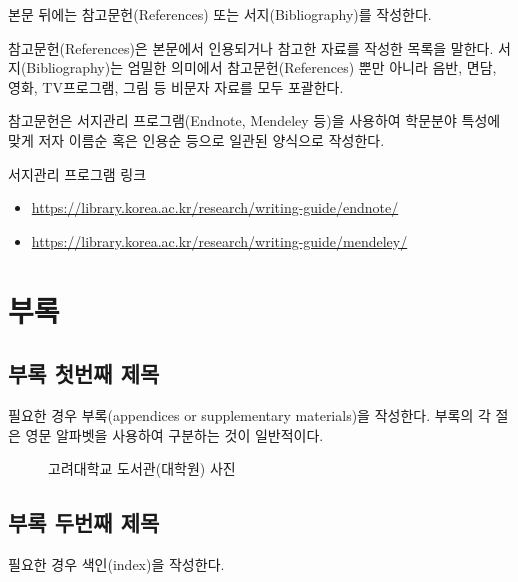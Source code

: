 \documentclass[11pt]{report}
\begin{document}
\bigskip

본문 뒤에는 참고문헌(References) 또는 서지(Bibliography)를 작성한다.\par
참고문헌(References)은 본문에서 인용되거나 참고한 자료를 작성한 목록을 말한다. 서지(Bibliography)는 엄밀한 의미에서 참고문헌(References) 뿐만 아니라 음반, 면담, 영화, TV프로그램, 그림 등 비문자 자료를 모두 포괄한다. \par
참고문헌은 서지관리 프로그램(Endnote, Mendeley 등)을 사용하여 학문분야 특성에 맞게 저자 이름순 혹은 인용순 등으로 일관된 양식으로 작성한다.


\bigskip

서지관리 프로그램 링크
\begin{itemize}
\item\url{https://library.korea.ac.kr/research/writing-guide/endnote/}
\item\url{https://library.korea.ac.kr/research/writing-guide/mendeley/}
\end{itemize}


\newpage



\appendix
\chapter*{부록}
\renewcommand{\thesection}{\Alph{section}}
\section{부록 첫번째 제목} 
필요한 경우 부록(appendices or supplementary materials)을 작성한다.
부록의 각 절은 영문 알파벳을 사용하여 구분하는 것이 일반적이다.
\bigskip
\begin{figure}[ht]
\begin{center}
\end{center}
\caption{고려대학교 도서관(대학원) 사진}
\end{figure}

\newpage
\section{부록 두번째 제목} 


\newpage
\renewcommand{\indexname}{색인}
\printindex
\bigskip

필요한 경우 색인(index)을 작성한다.
\end{document}
